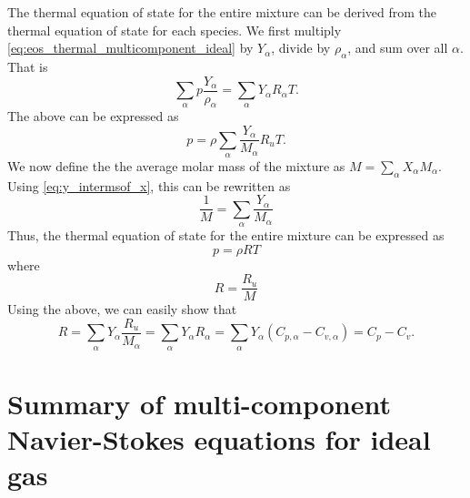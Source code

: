 \documentclass[oneside,a4paper,11pt]{report}
\begin{document}
The thermal equation of state for the entire mixture can be derived from the thermal equation of state for each species. We first multiply \cref{eq:eos_thermal_multicomponent_ideal} by $Y_\alpha$, divide by $\rho_\alpha$, and sum over all $\alpha$. That is
\begin{equation}
\sum_\alpha p \frac{Y_\alpha}{\rho_\alpha}= \sum_\alpha Y_\alpha R_\alpha T.
\end{equation}
The above can be expressed as
\begin{equation}
p = \rho \sum_\alpha \frac{Y_\alpha}{M_\alpha} R_u T.
\end{equation}
We now define the the average molar mass of the mixture as $M = \sum_\alpha X_\alpha M_\alpha$. Using \cref{eq:y_intermsof_x}, this can be rewritten as 
\begin{equation}
    \frac{1}{M} = \sum_\alpha \frac{Y_\alpha}{M_\alpha}
\end{equation}
Thus, the thermal equation of state for the entire mixture can be expressed as
\begin{equation}
    p = \rho R T
\end{equation}
where
\begin{equation}
R = \frac{R_u}{M}
\end{equation}
Using the above, we can easily show that
\begin{equation}
    R = \sum_\alpha Y_\alpha \frac{R_u}{M_\alpha} = \sum_\alpha Y_\alpha R_\alpha = \sum_\alpha Y_\alpha \left ( C_{p,\alpha} - C_{v,\alpha} \right ) = C_p - C_v.
\end{equation}

\section{Summary of multi-component Navier-Stokes equations for ideal gas}
\end{document}
